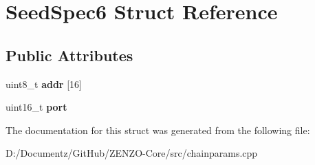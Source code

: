 \hypertarget{struct_seed_spec6}{}\section{Seed\+Spec6 Struct Reference}
\label{struct_seed_spec6}
\subsection*{Public Attributes}
\begin{DoxyCompactItemize}
\item 
\mbox{\label{struct_seed_spec6_ad08d58f6fcd19c2bdb1e24cde0791cbc}} 
uint8\+\_\+t {\bfseries addr} \mbox{[}16\mbox{]}
\item 
\mbox{\label{struct_seed_spec6_a48fdfc3ed14e7676b500bab2e2bcc643}} 
uint16\+\_\+t {\bfseries port}
\end{DoxyCompactItemize}


The documentation for this struct was generated from the following file\+:\begin{DoxyCompactItemize}
\item 
D\+:/\+Documentz/\+Git\+Hub/\+Z\+E\+N\+Z\+O-\/\+Core/src/chainparams.\+cpp\end{DoxyCompactItemize}
